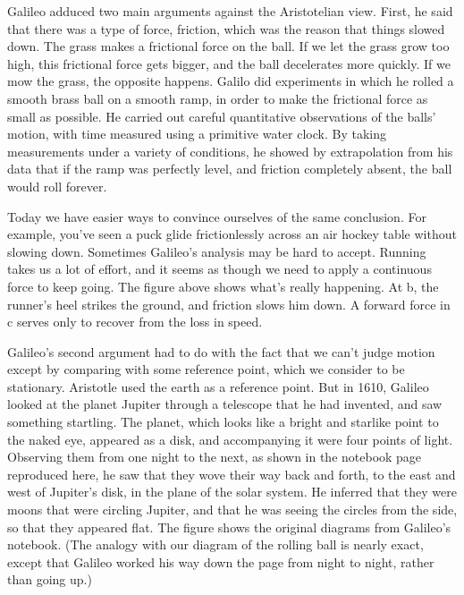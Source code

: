 


Galileo adduced two main arguments against the Aristotelian view. First, he said
that there was a type of force, friction, which was the reason that things slowed down.
The grass makes a frictional force on the ball. If we let the grass grow too high,
this frictional force gets bigger, and the ball decelerates more quickly. If we mow
the grass, the opposite happens. Galilo did experiments in which he rolled a smooth
brass ball on a smooth ramp, in order to make the frictional force as small as possible.
He carried out careful quantitative observations of the balls' motion, with time
measured using a primitive water clock. By taking measurements under a variety of
conditions, he showed by extrapolation from his data that if the ramp was perfectly level,
and friction completely absent, the ball would roll forever. 

Today we have easier ways
to convince ourselves of the same conclusion. For example, you've seen a puck glide frictionlessly
across an air hockey table without slowing down.
Sometimes Galileo's analysis may be hard to accept. Running takes us a lot of effort, and
it seems as though we need to apply a continuous force to keep going. The figure above shows what's really
happening. At b, the runner's heel strikes the ground, and friction slows him down. A forward
force in c serves only to recover from the loss in speed.




Galileo's second argument had to do with the fact that we can't judge motion except by
comparing with some reference point, which we consider to be stationary. Aristotle
used the earth as a reference point. 
But in 1610, Galileo looked at the planet Jupiter through a telescope that he had invented, and
saw something startling. The planet, which looks like a bright and starlike point to the naked eye,
appeared as a disk, and accompanying it were four points of light. Observing them from one
night to the next, as shown in the notebook page reproduced here, he saw that they wove their
way back and forth, to the east and west of Jupiter's disk, in the plane of the solar system.
He inferred that they were moons
that were circling Jupiter, and that he was seeing the circles from the side, so
that they appeared flat. The figure  shows the original diagrams from Galileo's notebook.
(The analogy with our diagram of the rolling ball is nearly exact,
except that Galileo worked his way down the page from night to night, rather than going up.)

